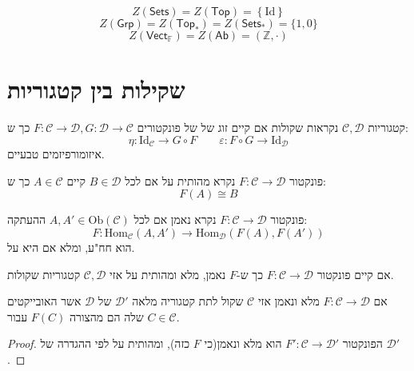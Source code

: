 \documentclass{tstextbook}
\begin{document}
\begin{example}
$$Z\left( \mathsf{Sets} \right)=Z\left( \mathsf{Top} \right)=\left\{  \mathrm{Id}  \right\}$$$$Z\left( \mathsf{Grp} \right)=Z\left( \mathsf{Top}_{*} \right)=Z\left( \mathsf{Sets}_{*} \right)=\{ 1,0 \}$$$$Z\left( \mathsf{Vect}_{\mathbb{F} } \right)=Z\left( \mathsf{Ab} \right)=\left( \mathbb{Z},\cdot \right)$$

\end{example}
\section{שקילות בין קטגוריות}

\begin{definition}
קטגוריות \(\mathcal{C},\mathcal{D}\) נקראות שקולות אם קיים זוג של של פונקטורים \(F:\mathcal{C}\to \mathcal{D},G:\mathcal{D}\to \mathcal{C}\) כך ש:
$$\eta:\mathrm{Id}_{\mathcal{C} }\to G\circ  F\qquad \varepsilon:F\circ G\to \mathrm{Id}_{\mathcal{D} }$$
איזומורפיזמים טבעיים.

\end{definition}
\begin{definition}
פונקטור \(F:\mathcal{C}\to \mathcal{D}\) נקרא מהותית על אם לכל \(B \in \mathcal{D}\) קיים \(A \in \mathcal{C}\) כך ש:
$$F(A)\cong  B$$

\end{definition}
\begin{reminder}
פונקטור \(F:\mathcal{C}\to \mathcal{D}\) נקרא נאמן אם לכל \(A,A' \in \mathrm{Ob}(\mathcal{C})\) ההעתקה:
$$F:\mathrm{Hom}_{\mathcal{C}}(A,A')\to \mathrm{Hom}_{\mathcal{D} }(F(A),F(A'))$$
הוא חח"ע, ומלא אם היא על.

\end{reminder}
\begin{proposition}
אם קיים פונקטור \(F:\mathcal{C}\to \mathcal{D}\) כך ש-\(F\) נאמן, מלא ומהותית על אזי \(\mathcal{C,D}\) קטגוריות שקולות.

\end{proposition}
\begin{corollary}
אם \(F:\mathcal{C}\to \mathcal{D}\) מלא ונאמן אזי \(\mathcal{C}\) שקול לתת קטגוריה מלאה \(\mathcal{D'}\) של \(\mathcal{D}\) אשר האובייקטים שלה הם מהצורה \(F(C)\) עבור \(C \in \mathcal{C}\).

\end{corollary}
\begin{proof}
הפונקטור \(F':\mathcal{C}\to \mathcal{D'}\) הוא מלא ונאמן(כי \(F\) כזה), ומהותית על לפי ההגדרה של \(\mathcal{D'}\).

\end{proof}
\end{document}
